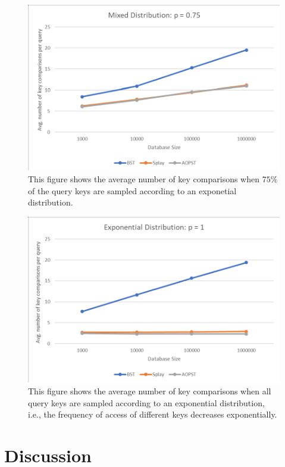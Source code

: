 \documentclass{article}
\newcommand{\figwid}{0.9\linewidth}
\begin{document}
\begin{figure}[H]
\begin{center}
\includegraphics[width=\figwid,keepaspectratio]{p-75.pdf}
\caption{\footnotesize This figure shows the average number of key comparisons when $75\%$ of the query keys are sampled according to an exponetial distribution.}
\label{fig:p-75}
\end{center}
\end{figure}

\begin{figure}[H]
\begin{center}
\includegraphics[width=\figwid,keepaspectratio]{p-1.pdf}
\caption{\footnotesize This figure shows the average number of key comparisons when all query keys are sampled according to an exponential distribution, i.e., the frequency of access of different keys decreases exponentially.}
\label{fig:p-1}
\end{center}
\end{figure}


\section{Discussion}
\end{document}

